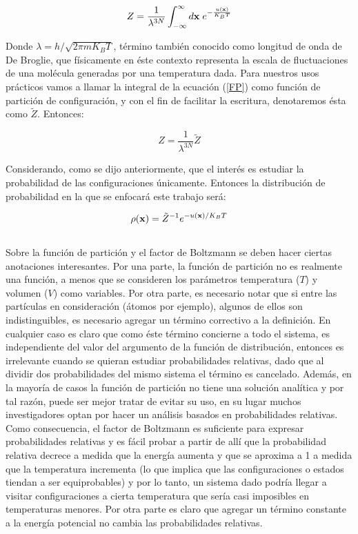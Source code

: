 \documentclass [11pt]{article}
\begin{document}
\begin{equation}\label{FP}
    Z=\frac{1}{\lambda^{3N}}\int_{-\infty}^{\infty}d{\bf x}{\hspace{0.1 cm}}e^{-\frac{u({\bf x})}{K_BT}}
\end{equation}

Donde $\lambda=h/\sqrt{2\pi m K_B T}$, término también conocido como longitud de onda de De Broglie, que físicamente en éste contexto representa la escala de fluctuaciones de una molécula generadas por una temperatura dada. Para nuestros usos prácticos vamos a llamar la integral de la ecuación (\ref{FP}) como función de partición de configuración, y con el fin de facilitar la escritura, denotaremos ésta como $\tilde Z$. Entonces:

\begin{equation}
    Z=\frac{1}{\lambda^{3N}}\tilde{Z}
\end{equation}

Considerando, como se dijo anteriormente, que el interés es estudiar la probabilidad de las configuraciones únicamente. Entonces la distribución de probabilidad en la que se enfocará este trabajo será:

\begin{equation}\label{densidad_proba}
    \rho({\bf x})=\tilde{Z}^{-1}e^{-u({\bf x})/K_BT}
\end{equation}\\

Sobre la función de partición y el factor de Boltzmann se deben hacer ciertas anotaciones interesantes. Por una parte, la función de partición no es realmente una función, a menos que se consideren los parámetros temperatura ($T$) y volumen ($V$) como variables. Por otra parte, es necesario notar que si entre las partículas en consideración (átomos por ejemplo), algunos de ellos son indistinguibles, es necesario agregar un término correctivo a la definición. En cualquier caso es claro que como éste término concierne a todo el sistema, es independiente del valor del argumento de la función de distribución, entonces es irrelevante cuando se quieran estudiar probabilidades relativas, dado que al dividir dos probabilidades del mismo sistema el término es cancelado. Además, en la mayoría de casos la función de partición no tiene una solución analítica y por tal razón, puede ser mejor tratar de evitar su uso, en su lugar muchos investigadores optan por hacer un análisis basados en probabilidades relativas. Como consecuencia, el factor de Boltzmann es suficiente para expresar probabilidades relativas y es fácil probar a partir de allí que la probabilidad relativa decrece a medida que la energía aumenta y que se aproxima a 1 a medida que la temperatura incrementa (lo que implica que las configuraciones o estados tiendan a ser equiprobables) y por lo tanto, un sistema dado podría llegar a visitar configuraciones a cierta temperatura que sería casi imposibles en temperaturas menores. Por otra parte es claro que agregar un término constante a la energía potencial no cambia las probabilidades relativas.\\
\end{document}
